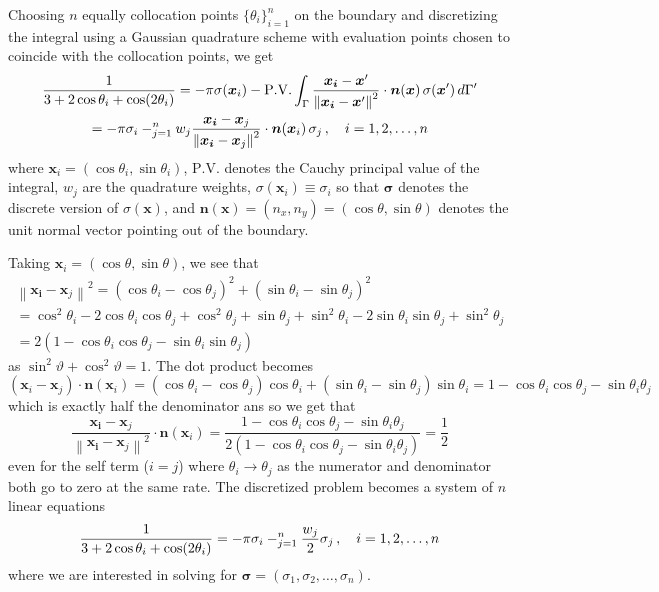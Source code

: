 \documentclass[11pt]{article}
\let\sumop\relax
\newcommand{\norm}[1]{\left\lVert#1\right\rVert}
\begin{document}
Choosing $n$ equally collocation points $\{\theta_i\}_{i=1}^n$ on the boundary and discretizing the integral using a Gaussian quadrature scheme with evaluation points chosen to coincide with the collocation points, we get
\begin{multline*}
  \frac{1}{3 + 2\cos\theta_i + \cos(2\theta_i)}
  = -\pi\sigma(\bm{x}_i) - \mathrm{P.V.}\int_\Gamma \frac{\bm{x_i}-\bm{x}'}{\norm{\bm{x_i}-\bm{x}'}^2} \cdot \bm{n}(\bm{x}) \, \sigma(\bm{x}') \, d\Gamma' \\
  = -\pi \sigma_i - \sumop_{j=1}^n w_j \frac{\bm{x_i}-\bm{x}_j}{\norm{\bm{x_i}-\bm{x}_j}^2} \cdot \bm{n}(\bm{x}_i) \, \sigma_j  \, , \quad i = 1,2,\dots,n 
\end{multline*}
where $\bm{x}_i = (\cos\theta_i, \sin\theta_i)$, $\mathrm{P.V.}$ denotes the Cauchy principal value of the integral, $w_j$ are the quadrature weights, $\sigma(\bm{x}_i) \equiv \sigma_i$ so that $\bm{\sigma}$ denotes the discrete version of $\sigma(\bm{x})$, and $\bm{n}(\bm{x}) = (n_x, n_y) = (\cos\theta, \sin\theta)$ denotes the unit normal vector pointing out of the boundary.

Taking $\bm{x}_i = (\cos\theta, \sin\theta)$, we see that
\begin{multline*}
  \norm{\bm{x_i}-\bm{x}_j}^2
  = (\cos\theta_i - \cos\theta_j)^2 + (\sin\theta_i - \sin\theta_j)^2 \\
  = \cos^2\theta_i - 2\cos\theta_i\cos\theta_j + \cos^2\theta_j + \sin\theta_j + \sin^2\theta_i - 2\sin\theta_i\sin\theta_j + \sin^2\theta_j \\
   = 2(1 - \cos\theta_i\cos\theta_j - \sin\theta_i\sin\theta_j)
\end{multline*}
as $\sin^2\vartheta + \cos^2\vartheta = 1$. The dot product becomes
\begin{equation*}
  (\bm{x}_i - \bm{x}_j) \cdot \bm{n}(\bm{x}_i)
  = (\cos\theta_i - \cos\theta_j)\cos\theta_i + (\sin\theta_i - \sin\theta_j)\sin\theta_i
  = 1 - \cos\theta_i\cos\theta_j - \sin\theta_i\theta_j
\end{equation*}
which is exactly half the denominator ans so we get that
\begin{equation*}
  \frac{\bm{x_i}-\bm{x}_j}{\norm{\bm{x_i}-\bm{x}_j}^2} \cdot \bm{n}(\bm{x}_i)
  = \frac{1 - \cos\theta_i\cos\theta_j - \sin\theta_i\theta_j}{2(1 - \cos\theta_i\cos\theta_j - \sin\theta_i\theta_j)}
  = \frac{1}{2}
\end{equation*}
even for the self term ($i=j$) where $\theta_i \rightarrow \theta_j$ as the numerator and denominator both go to zero at the same rate. The discretized problem becomes a system of $n$ linear equations 
\begin{equation*}
  \frac{1}{3 + 2\cos\theta_i + \cos(2\theta_i)}
  = -\pi\sigma_i - \sumop_{j=1}^n \frac{w_j}{2} \sigma_j \, , \quad i = 1,2,\dots,n
\end{equation*}
where we are interested in solving for $\bm{\sigma} = (\sigma_1, \sigma_2, \dots, \sigma_n)$.
\end{document}
